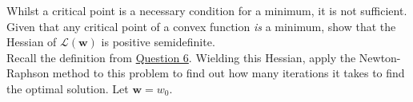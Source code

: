 \documentclass[12pt,dvipsnames,addpoints]{exam}
\renewcommand\vec{\mathbf}
\begin{document}
\begin{questions}
    \question[1] Whilst a critical point is a necessary condition for a minimum, it is not sufficient. Given that any critical point of a convex function \emph{is} a minimum, show that the Hessian of $\mathcal{L}(\vec{w})$ is positive semidefinite. \\Recall the definition from \hyperref[q:psd]{Question 6}.
    \question[2] Wielding this Hessian, apply the Newton-Raphson method to this problem to find out how many iterations it takes to find the optimal solution. Let $\vec{w} = w_0$.
\end{questions}
\end{document}
